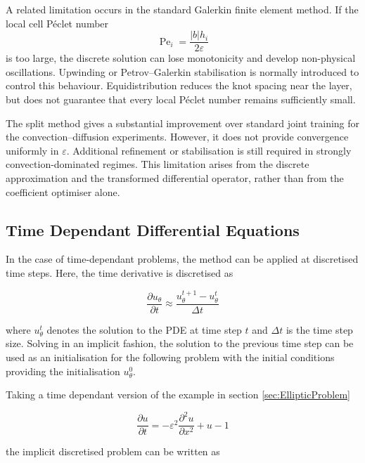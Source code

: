 \documentclass[11pt, onecolumn]{report}
\begin{document}
A related limitation occurs in the standard Galerkin finite element method. If the local cell Péclet number
\begin{equation*}
    \operatorname{Pe}_i
    =
    \frac{|b|h_i}{2\varepsilon}
\end{equation*}
is too large, the discrete solution can lose monotonicity and develop non-physical oscillations. Upwinding or Petrov--Galerkin stabilisation is normally introduced to control this behaviour. Equidistribution reduces the knot spacing near the layer, but does not guarantee that every local Péclet number remains sufficiently small.

The split method gives a substantial improvement over standard joint training for the convection--diffusion experiments. However, it does not provide convergence uniformly in \(\varepsilon\). Additional refinement or stabilisation is still required in strongly convection-dominated regimes. This limitation arises from the discrete approximation and the transformed differential operator, rather than from the coefficient optimiser alone.


\subsection{Time Dependant Differential Equations}
\label{sec:timesteppingMethod}
In the case of time-dependant problems, the method can be applied at discretised time steps. Here, the time derivative is discretised as

\begin{equation*}
    \frac{\partial u_\theta}{\partial t} \approx \frac{u^{t+1}_\theta - u^t_\theta}{\Delta t}
\end{equation*}

where $u^t_\theta$ denotes the solution to the PDE at time step $t$ and $\Delta t$ is the time step size. Solving in an implicit fashion, the solution to the previous time step can be used as an initialisation for the following problem with the initial conditions providing the initialisation $u_\theta^0$. 

Taking a time dependant version of the example in section \ref{sec:EllipticProblem}

\begin{equation*}
    \frac{\partial u}{\partial t} = -\varepsilon^2 \frac{\partial^2 u}{\partial x^2} + u - 1 
\end{equation*}

the implicit discretised problem can be written as 
\end{document}

